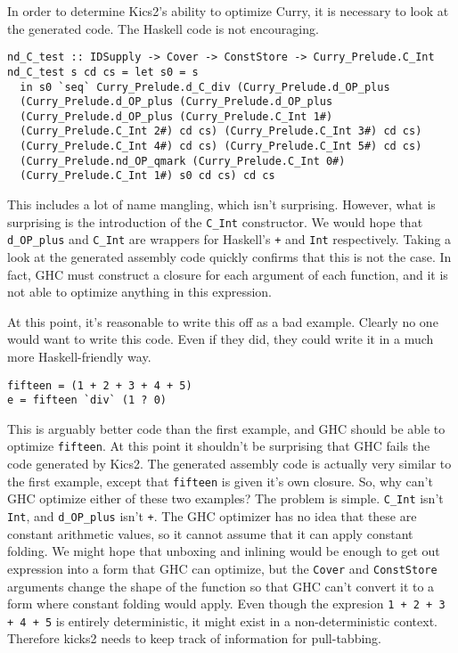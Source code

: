 In order to determine Kics2's ability to optimize Curry, it is necessary to look at the generated code.
The Haskell code is not encouraging.

\begin{verbatim}
nd_C_test :: IDSupply -> Cover -> ConstStore -> Curry_Prelude.C_Int
nd_C_test s cd cs = let s0 = s
  in s0 `seq` Curry_Prelude.d_C_div (Curry_Prelude.d_OP_plus
  (Curry_Prelude.d_OP_plus (Curry_Prelude.d_OP_plus 
  (Curry_Prelude.d_OP_plus (Curry_Prelude.C_Int 1#)
  (Curry_Prelude.C_Int 2#) cd cs) (Curry_Prelude.C_Int 3#) cd cs) 
  (Curry_Prelude.C_Int 4#) cd cs) (Curry_Prelude.C_Int 5#) cd cs) 
  (Curry_Prelude.nd_OP_qmark (Curry_Prelude.C_Int 0#) 
  (Curry_Prelude.C_Int 1#) s0 cd cs) cd cs
\end{verbatim}

This includes a lot of name mangling, which isn't surprising.
However, what is surprising is the introduction of the \texttt{C\_Int} constructor.
We would hope that \texttt{d\_OP\_plus} and \texttt{C\_Int} 
are wrappers for Haskell's \texttt{+} and \texttt{Int} respectively.
Taking a look at the generated assembly code quickly confirms that this is not the case.
In fact, GHC must construct a closure for each argument of each function, and it is not able to optimize anything in this expression.

At this point, it's reasonable to write this off as a bad example.  Clearly no one would want to write this code.
Even if they did, they could write it in a much more Haskell-friendly way.

\begin{verbatim}
fifteen = (1 + 2 + 3 + 4 + 5)
e = fifteen `div` (1 ? 0)
\end{verbatim}

This is arguably better code than the first example, and GHC should be able to optimize \texttt{fifteen}.
At this point it shouldn't be surprising that GHC fails the code generated by Kics2.
The generated assembly code is actually very similar to the first example, except that \texttt{fifteen}
is given it's own closure.
So, why can't GHC optimize either of these two examples?
The problem is simple.  \texttt{C\_Int} isn't \texttt{Int}, and \texttt{d\_OP\_plus} isn't \texttt{+}.
The GHC optimizer has no idea that these are constant arithmetic values, so it
cannot assume that it can apply constant folding.
We might hope that unboxing and inlining would be enough to get out expression into a form
that GHC can optimize, but the \texttt{Cover} and \texttt{ConstStore} arguments 
change the shape of the function so that GHC can't convert it to a form where constant folding would apply.
Even though the expresion \texttt{1 + 2 + 3 + 4 + 5} is entirely deterministic, it might exist
in a non-deterministic context.
Therefore kicks2 needs to keep track of information for pull-tabbing.

